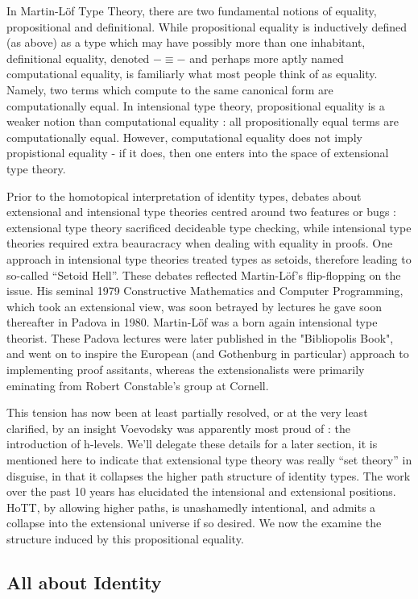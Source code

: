 \documentclass[11pt, a4paper]{article}
\begin{document}
In Martin-Löf Type Theory, there are two fundamental notions of equality,
propositional and definitional.  While propositional equality is inductively
defined (as above) as a type which may have possibly more than one inhabitant,
definitional equality, denoted $-\equiv -$ and perhaps more aptly named
computational equality, is familiarly what most people think of as equality.
Namely, two terms which compute to the same canonical form are computationally
equal. In intensional type theory, propositional equality is a weaker notion
than computational equality : all propositionally equal terms are
computationally equal. However, computational equality does not imply
propistional equality - if it does, then one enters into the space of
extensional type theory. 

Prior to the homotopical interpretation of identity types, debates about
extensional and intensional type theories centred around two features or bugs :
extensional type theory sacrificed decideable type checking, while intensional
type theories required extra beauracracy when dealing with equality in proofs.
One approach in intensional type theories treated types as setoids, therefore
leading to so-called ``Setoid Hell''. These debates reflected Martin-Löf's
flip-flopping on the issue. His seminal 1979 Constructive Mathematics and
Computer Programming, which took an extensional view, was soon betrayed by
lectures he gave soon thereafter in Padova in 1980.  Martin-Löf was a born
again intensional type theorist.  These Padova lectures were later published in
the "Bibliopolis Book", and went on to inspire the European (and Gothenburg in
particular) approach to implementing proof assitants, whereas the
extensionalists were primarily eminating from Robert Constable's group at
Cornell. 

This tension has now been at least partially resolved, or at the very least
clarified, by an insight Voevodsky was apparently most proud of : the
introduction of h-levels. We'll delegate these details for a later section, it
is mentioned here to indicate that extensional type theory was really ``set
theory'' in disguise, in that it collapses the higher path structure of
identity types. The work over the past 10 years has elucidated the intensional
and extensional positions. HoTT, by allowing higher paths, is unashamedly
intentional, and admits a collapse into the extensional universe if so desired.
We now the examine the structure induced by this propositional equality.

\subsection{All about Identity}
\end{document}
